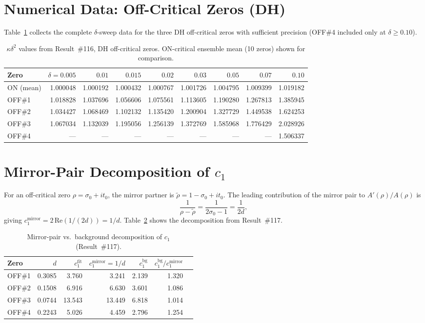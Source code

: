 \documentclass[11pt, a4paper]{article}
\theoremstyle{plain}
\theoremstyle{definition}
\begin{document}
\section{Numerical Data: Off-Critical Zeros (DH)}
\label{app:dhzeros}

Table~\ref{tab:dhdata} collects the complete $\delta$-sweep data for the
three DH off-critical zeros with sufficient precision (OFF\#4 included
only at $\delta\geq 0.10$).

\begin{table}[ht]
\centering
\caption{$\kappa\delta^{2}$ values from Result~\#116, DH off-critical zeros.
  ON-critical ensemble mean (10 zeros) shown for comparison.}
\label{tab:dhdata}
\small
\begin{tabular}{lrrrrrrrr}
\toprule
Zero & $\delta{=}0.005$ & $0.01$ & $0.015$ & $0.02$ & $0.03$ & $0.05$ & $0.07$ & $0.10$ \\
\midrule
ON (mean) & 1.000048 & 1.000192 & 1.000432 & 1.000767 & 1.001726 & 1.004795 & 1.009399 & 1.019182 \\
OFF\#1 & 1.018828 & 1.037696 & 1.056606 & 1.075561 & 1.113605 & 1.190280 & 1.267813 & 1.385945 \\
OFF\#2 & 1.034427 & 1.068469 & 1.102132 & 1.135420 & 1.200904 & 1.327729 & 1.449538 & 1.624253 \\
OFF\#3 & 1.067034 & 1.132039 & 1.195056 & 1.256139 & 1.372769 & 1.585968 & 1.776429 & 2.028926 \\
OFF\#4 & --- & --- & --- & --- & --- & --- & --- & 1.506337 \\
\bottomrule
\end{tabular}
\end{table}


\section{Mirror-Pair Decomposition of $c_{1}$}
\label{app:mirror}

For an off-critical zero $\rho=\sigma_{0}+it_{0}$, the mirror partner
is $\tilde\rho=1-\sigma_{0}+it_{0}$.  The leading contribution of the
mirror pair to $A'(\rho)/A(\rho)$ is
\[
  \frac{1}{\rho-\tilde\rho} = \frac{1}{2\sigma_{0}-1} = \frac{1}{2d},
\]
giving $c_{1}^{\text{mirror}} = 2\,\mathrm{Re}(1/(2d)) = 1/d$.
Table~\ref{tab:mirror} shows the decomposition from Result~\#117.

\begin{table}[ht]
\centering
\caption{Mirror-pair vs.\ background decomposition of $c_{1}$ (Result~\#117).}
\label{tab:mirror}
\small
\begin{tabular}{lrrrrrr}
\toprule
Zero & $d$ & $c_{1}^{\text{fit}}$ & $c_{1}^{\text{mirror}}=1/d$ & $c_{1}^{\text{bg}}$ & $c_{1}^{\text{bg}}/c_{1}^{\text{mirror}}$ \\
\midrule
OFF\#1 & 0.3085 & 3.760 & 3.241 & 2.139 & 1.320 \\
OFF\#2 & 0.1508 & 6.916 & 6.630 & 3.601 & 1.086 \\
OFF\#3 & 0.0744 & 13.543 & 13.449 & 6.818 & 1.014 \\
OFF\#4 & 0.2243 & 5.026 & 4.459 & 2.796 & 1.254 \\
\bottomrule
\end{tabular}
\end{table}
\end{document}
